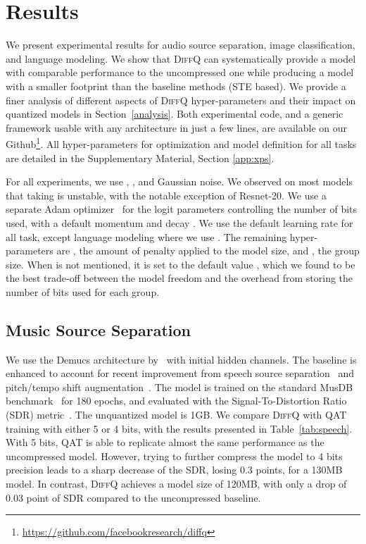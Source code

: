 \documentclass{article}
\newcommand{\diffq}{\textsc{DiffQ}\xspace}
\begin{document}
\vspace{-0.2cm}
\section{Results}
\label{results}
\renewcommand\UrlFont{\color{purple}\rmfamily}
We present experimental results for audio source separation, image classification, and language modeling. We show that \diffq{} can systematically provide a model with comparable performance to the uncompressed one while producing a model with a smaller footprint than the baseline methods (STE based).
We provide a finer analysis of different aspects of \diffq hyper-parameters and their impact on quantized models in Section~\ref{analysis}. Both experimental code, and a generic framework usable with any architecture in just a few lines, are available on our Github\footnote{\url{https://github.com/facebookresearch/diffq}}.
All hyper-parameters for optimization and model definition for all tasks are detailed in the Supplementary Material, Section \ref{app:xps}.



\noindent{\bf {\diffq{} hyper-parameters}}
For all experiments, we use , ,
 and Gaussian noise. 
We observed on most models that taking  is
unstable, with the notable exception of Resnet-20.
We use a separate Adam optimizer~\citep{adam} for the logit parameters controlling the number of bits used, with a default momentum  and decay .
We use the default learning rate  for all task,
except language modeling where we use .
The remaining hyper-parameters are , the amount of penalty
applied to the model size, and , the group size. When  is not mentioned, it is set to the default value , which we found to be the best trade-off between the model freedom and the overhead from storing the number of bits used for each group. 

\vspace{-0.1cm}
\subsection{Music Source Separation}
\vspace{-0.1cm}
We use the Demucs architecture by~\citet{defossez2019music} with  initial hidden channels.
The baseline is enhanced to account for recent improvement from speech source separation~\citep{defossez2020real} and pitch/tempo shift augmentation~\citep{cohen2019improving}. The model is trained on the standard MusDB benchmark~\citep{musdb} for 180 epochs, and evaluated with the Signal-To-Distortion Ratio (SDR) metric~\citep{measures}. The unquantized model is 1GB. We compare \diffq{} with QAT training with either 5 or 4 bits, with the results presented in Table~\ref{tab:speech}. With 5 bits, QAT is able to replicate almost the same performance as the uncompressed model.
However, trying to further compress the model to 4 bits precision leads to a sharp decrease of the SDR, losing 0.3 points, for a 130MB model. In contrast, \diffq{} achieves a model size of 120MB, with only
a drop of 0.03 point of SDR compared to the uncompressed baseline.
\end{document}
